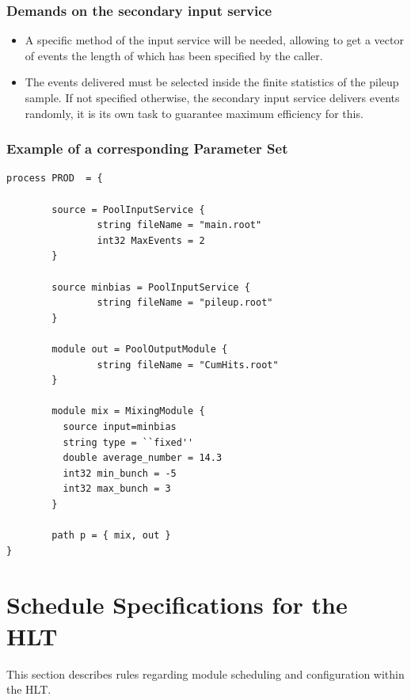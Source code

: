 \documentclass[draftmode]{memarticle}
\begin{document}
\subsubsection {Demands on the secondary input service}
\begin{itemize}
\item
A specific method of the input service will be needed, allowing to get a 
vector of events 
the length of which has been specified by the caller. 
\item
The events delivered must be selected inside the finite statistics of the pileup sample.
If not specified otherwise, the secondary input service delivers events randomly, it is its own task to guarantee maximum 
efficiency for this.

\end{itemize}
 \subsubsection {Example of a corresponding Parameter Set} 
\begin{verbatim}
process PROD  = {

        source = PoolInputService {
                string fileName = "main.root"
                int32 MaxEvents = 2
        }

        source minbias = PoolInputService {
                string fileName = "pileup.root"
        }

        module out = PoolOutputModule {
                string fileName = "CumHits.root"
        }

        module mix = MixingModule {
          source input=minbias
          string type = ``fixed''
          double average_number = 14.3
          int32 min_bunch = -5
          int32 max_bunch = 3
        }

        path p = { mix, out }
}
\end{verbatim}



\section{Schedule Specifications for the HLT}

This section describes rules regarding module scheduling and
configuration within the HLT.
\end{document}
